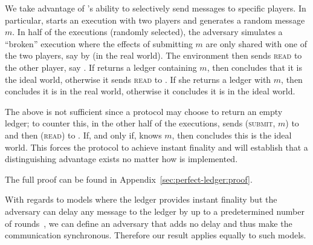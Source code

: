   \begin{proofsketch}
    We take advantage of \perfectadv's ability to selectively send messages to
    specific players. In particular, \perfectenv{} starts an execution with two
    players and generates a random message $m$. In half of the executions
    (randomly selected),  the adversary simulates a ``broken''  \perfectprot{}
    execution where the effects of submitting $m$ are only shared with one of
    the two players, say \alice{} by \perfectadv{} (in the real world). The
    environment then sends \textsc{read} to the other player, say \bob. If
    \bob{} returns a ledger containing $m$, then \perfectenv{} concludes that it
    is the ideal world, otherwise it sends \textsc{read} to \alice. If she
    returns a ledger with $m$, then \perfectenv{} concludes it is in the real
    world, otherwise it concludes it is in the ideal world.

    The above is not sufficient since a protocol may choose to return an empty
    ledger; to counter this, in the other half of the executions, \perfectenv{}
    sends (\textsc{submit}, $m$) to \alice{} and then (\textsc{read}) to \bob.
    If, and only if, \bob{} knows $m$, then \perfectenv{} concludes this is the
    ideal world. This forces the \perfectprot{} protocol to achieve instant
    finality and will establish that a distinguishing advantage exists no matter
    how \perfectprot{} is implemented.
  \end{proofsketch}

  The full proof can be found in Appendix~\ref{sec:perfect-ledger:proof}.

  With regards to models where the ledger provides instant finality but the
  adversary can delay any message to the ledger by up to a predetermined number
  of rounds~\cite{DBLP:conf/ccs/DziembowskiFH18}, we can define an adversary
  that adds no delay and thus make the communication synchronous. Therefore our
  result applies equally to such models.
